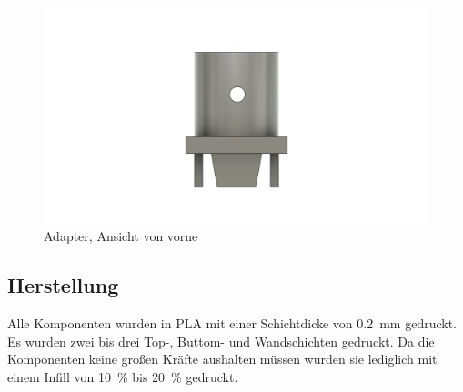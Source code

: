 \begin{figure}[H]
  \centering
  \includegraphics[width=\textwidth]{./img/ST_Adapterv4_front}
  \caption{Adapter, Ansicht von vorne}\label{fig:adapter_front}
\end{figure}
\subsection{Herstellung}\label{sec:ge_herst}
Alle Komponenten wurden in PLA mit einer Schichtdicke von \SI{0.2}{\milli\meter} gedruckt. Es wurden zwei bis drei Top-, Buttom- und Wandschichten gedruckt. Da die Komponenten keine großen Kräfte aushalten müssen wurden sie lediglich mit einem Infill von \SI{10}{\percent} bis \SI{20}{\percent} gedruckt.
